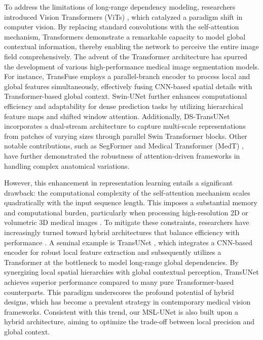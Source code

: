 \documentclass[10pt, a4paper, twocolumn]{article}
\begin{document}
To address the limitations of long-range dependency modeling, researchers introduced Vision Transformers (ViTs) \cite{dosovitskiy2020vit}, which catalyzed a paradigm shift in computer vision. By replacing standard convolutions with the self-attention mechanism, Transformers demonstrate a remarkable capacity to model global contextual information, thereby enabling the network to perceive the entire image field comprehensively. The advent of the Transformer architecture has spurred the development of various high-performance medical image segmentation models. For instance, TransFuse \cite{zhang2021transfuse} employs a parallel-branch encoder to process local and global features simultaneously, effectively fusing CNN-based spatial details with Transformer-based global context. Swin-UNet \cite{cao2023swin} further enhances computational efficiency and adaptability for dense prediction tasks by utilizing hierarchical feature maps and shifted window attention. Additionally, DS-TransUNet \cite{lin2022ds} incorporates a dual-stream architecture to capture multi-scale representations from patches of varying sizes through parallel Swin Transformer blocks. Other notable contributions, such as SegFormer \cite{xie2021segformer} and Medical Transformer (MedT) \cite{valanarasu2021medical}, have further demonstrated the robustness of attention-driven frameworks in handling complex anatomical variations.

However, this enhancement in representation learning entails a significant drawback: the computational complexity of the self-attention mechanism scales quadratically with the input sequence length. This imposes a substantial memory and computational burden, particularly when processing high-resolution 2D or volumetric 3D medical images \cite{vaswani2017attention, hatamizadeh2022unetr}. To mitigate these constraints, researchers have increasingly turned toward hybrid architectures that balance efficiency with performance \cite{xie2021cotr}. A seminal example is TransUNet \cite{chen2021transunet}, which integrates a CNN-based encoder for robust local feature extraction and subsequently utilizes a Transformer at the bottleneck to model long-range global dependencies. By synergizing local spatial hierarchies with global contextual perception, TransUNet achieves superior performance compared to many pure Transformer-based counterparts. This paradigm underscores the profound potential of hybrid designs, which has become a prevalent strategy in contemporary medical vision frameworks. Consistent with this trend, our MSL-UNet is also built upon a hybrid architecture, aiming to optimize the trade-off between local precision and global context.
\end{document}
